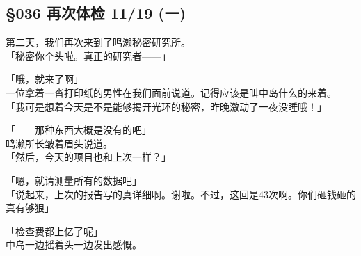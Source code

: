 \subsection{§036 再次体检 11/19 (一)}

第二天，我们再次来到了鸣濑秘密研究所。\\

「秘密你个头啦。真正的研究者——」

「哦，就来了啊」\\

一位拿着一沓打印纸的男性在我们面前说道。记得应该是叫中岛什么的来着。\\

「我可是想着今天是不是能够揭开光环的秘密，昨晚激动了一夜没睡哦！」

「——那种东西大概是没有的吧」\\

鸣濑所长皱着眉头说道。\\

「然后，今天的项目也和上次一样？」

「嗯，就请测量所有的数据吧」\\

「说起来，上次的报告写的真详细啊。谢啦。不过，这回是43次啊。你们砸钱砸的真有够狠」

「检查费都上亿了呢」\\

中岛一边摇着头一边发出感慨。\\

